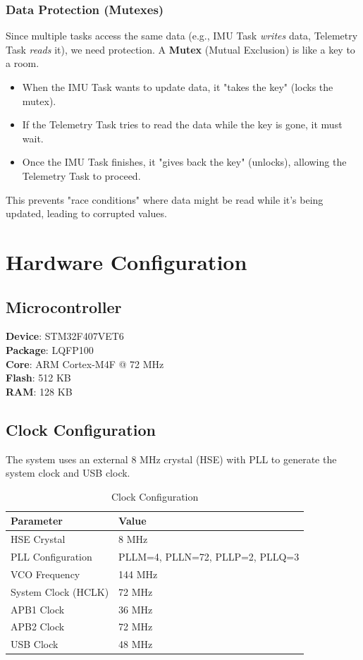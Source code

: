 \documentclass[11pt,a4paper]{article}
\begin{document}
\subsubsection{Data Protection (Mutexes)}
Since multiple tasks access the same data (e.g., IMU Task \textit{writes} data, Telemetry Task \textit{reads} it), we need protection. A \textbf{Mutex} (Mutual Exclusion) is like a key to a room.
\begin{itemize}
    \item When the IMU Task wants to update data, it "takes the key" (locks the mutex).
    \item If the Telemetry Task tries to read the data while the key is gone, it must wait.
    \item Once the IMU Task finishes, it "gives back the key" (unlocks), allowing the Telemetry Task to proceed.
\end{itemize}
This prevents "race conditions" where data might be read while it's being updated, leading to corrupted values.

\section{Hardware Configuration}

\subsection{Microcontroller}
\textbf{Device}: STM32F407VET6 \\
\textbf{Package}: LQFP100 \\
\textbf{Core}: ARM Cortex-M4F @ 72 MHz \\
\textbf{Flash}: 512 KB \\
\textbf{RAM}: 128 KB

\subsection{Clock Configuration}

The system uses an external 8 MHz crystal (HSE) with PLL to generate the system clock and USB clock.

\begin{table}[H]
\centering
\begin{tabular}{@{}ll@{}}
\toprule
\textbf{Parameter} & \textbf{Value} \\
\midrule
HSE Crystal & 8 MHz \\
PLL Configuration & PLLM=4, PLLN=72, PLLP=2, PLLQ=3 \\
VCO Frequency & 144 MHz \\
System Clock (HCLK) & 72 MHz \\
APB1 Clock & 36 MHz \\
APB2 Clock & 72 MHz \\
USB Clock & 48 MHz \\
\bottomrule
\end{tabular}
\caption{Clock Configuration}
\end{table}
\end{document}
